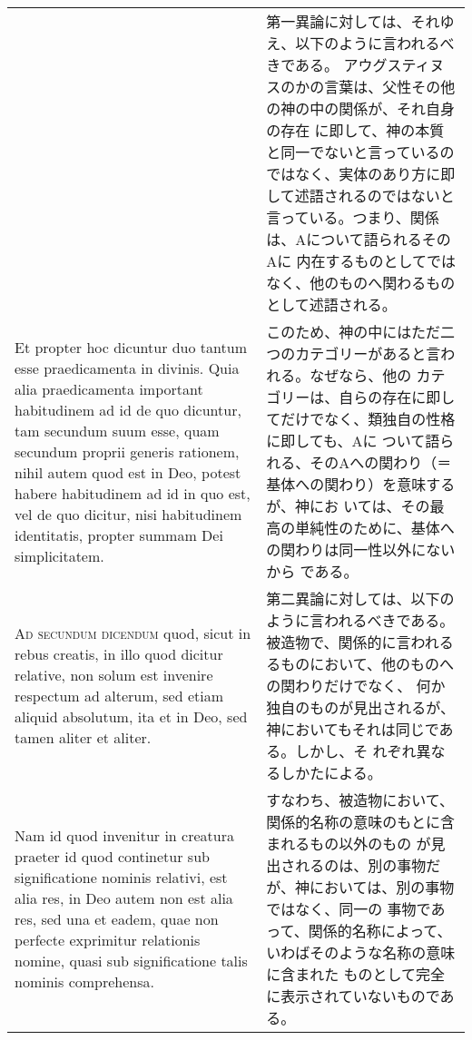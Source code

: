 \documentclass[10pt]{jsarticle} %
\begin{document}
\begin{longtable}{p{21em}p{21em}}
&

第一異論に対しては、それゆえ、以下のように言われるべきである。
アウグスティヌスのかの言葉は、父性その他の神の中の関係が、それ自身の存在
 に即して、神の本質と同一でないと言っているのではなく、実体のあり方に即
 して述語されるのではないと言っている。つまり、関係は、Aについて語られるそのAに
 内在するものとしてではなく、他のものへ関わるものとして述語される。


\\

Et propter hoc dicuntur duo tantum esse praedicamenta in
divinis. Quia alia praedicamenta important habitudinem ad id de quo
dicuntur, tam secundum suum esse, quam secundum proprii generis
rationem, nihil autem quod est in Deo, potest habere habitudinem ad id
in quo est, vel de quo dicitur, nisi habitudinem identitatis, propter
summam Dei simplicitatem.


&

このため、神の中にはただ二つのカテゴリーがあると言われる。なぜなら、他の
 カテゴリーは、自らの存在に即してだけでなく、類独自の性格に即しても、Aに
 ついて語られる、そのAへの関わり（＝基体への関わり）を意味するが、神にお
 いては、その最高の単純性のために、基体への関わりは同一性以外にないから
 である。

\\



{\scshape Ad secundum dicendum} quod, sicut in rebus creatis, in illo quod dicitur
relative, non solum est invenire respectum ad alterum, sed etiam aliquid
absolutum, ita et in Deo, sed tamen aliter et aliter. 


&

第二異論に対しては、以下のように言われるべきである。
被造物で、関係的に言われるるものにおいて、他のものへの関わりだけでなく、
 何か独自のものが見出されるが、神においてもそれは同じである。しかし、そ
 れぞれ異なるしかたによる。

\\

Nam id quod
invenitur in creatura praeter id quod continetur sub significatione
nominis relativi, est alia res, in Deo autem non est alia res, sed una
et eadem, quae non perfecte exprimitur relationis nomine, quasi sub
significatione talis nominis comprehensa. 


&

すなわち、被造物において、関係的名称の意味のもとに含まれるもの以外のもの
 が見出されるのは、別の事物だが、神においては、別の事物ではなく、同一の
 事物であって、関係的名称によって、いわばそのような名称の意味に含まれた
 ものとして完全に表示されていないものである。


\end{longtable}
\end{document}
